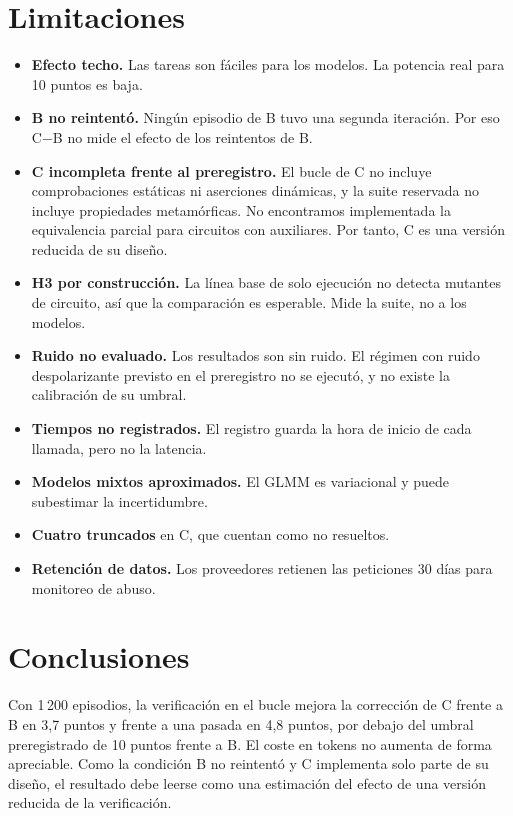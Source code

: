 \documentclass[conference]{IEEEtran}
\begin{document}
\section{Limitaciones}
\begin{itemize}
\item \textbf{Efecto techo.} Las tareas son fáciles para los modelos. La potencia real para 10 puntos es baja.
\item \textbf{B no reintentó.} Ningún episodio de B tuvo una segunda iteración. Por eso C$-$B no mide el efecto de los reintentos de B.
\item \textbf{C incompleta frente al preregistro.} El bucle de C no incluye comprobaciones estáticas ni aserciones dinámicas, y la suite reservada no incluye propiedades metamórficas. No encontramos implementada la equivalencia parcial para circuitos con auxiliares. Por tanto, C es una versión reducida de su diseño.
\item \textbf{H3 por construcción.} La línea base de solo ejecución no detecta mutantes de circuito, así que la comparación es esperable. Mide la suite, no a los modelos.
\item \textbf{Ruido no evaluado.} Los resultados son sin ruido. El régimen con ruido despolarizante previsto en el preregistro no se ejecutó, y no existe la calibración de su umbral.
\item \textbf{Tiempos no registrados.} El registro guarda la hora de inicio de cada llamada, pero no la latencia.
\item \textbf{Modelos mixtos aproximados.} El GLMM es variacional y puede subestimar la incertidumbre.
\item \textbf{Cuatro truncados} en C, que cuentan como no resueltos.
\item \textbf{Retención de datos.} Los proveedores retienen las peticiones 30 días para monitoreo de abuso.
\end{itemize}

\section{Conclusiones}
Con 1\,200 episodios, la verificación en el bucle mejora la corrección de C frente a B en 3,7 puntos y frente a una pasada en 4,8 puntos,
por debajo del umbral preregistrado de 10 puntos frente a B. El coste en tokens no aumenta de forma apreciable. Como la condición B no reintentó
y C implementa solo parte de su diseño, el resultado debe leerse como una estimación del efecto de una versión reducida de la verificación.



\end{document}
